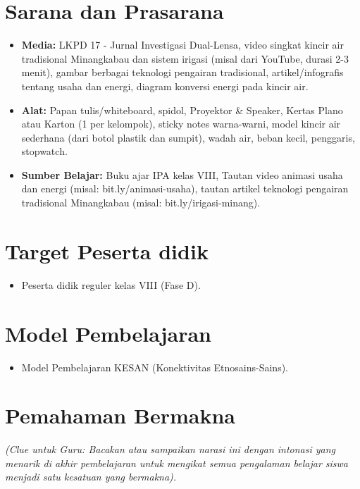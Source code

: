 \documentclass[12pt,a4paper]{article}
\begin{document}
\section{Sarana dan Prasarana}

\begin{itemize}
\item \textbf{Media:} LKPD 17 - Jurnal Investigasi Dual-Lensa, video singkat kincir air tradisional Minangkabau dan sistem irigasi (misal dari YouTube, durasi 2-3 menit), gambar berbagai teknologi pengairan tradisional, artikel/infografis tentang usaha dan energi, diagram konversi energi pada kincir air.
\item \textbf{Alat:} Papan tulis/whiteboard, spidol, Proyektor \& Speaker, Kertas Plano atau Karton (1 per kelompok), sticky notes warna-warni, model kincir air sederhana (dari botol plastik dan sumpit), wadah air, beban kecil, penggaris, stopwatch.
\item \textbf{Sumber Belajar:} Buku ajar IPA kelas VIII, Tautan video animasi usaha dan energi (misal: bit.ly/animasi-usaha), tautan artikel teknologi pengairan tradisional Minangkabau (misal: bit.ly/irigasi-minang).
\end{itemize}

\section{Target Peserta didik}

\begin{itemize}
\item Peserta didik reguler kelas VIII (Fase D).
\end{itemize}

\section{Model Pembelajaran}

\begin{itemize}
\item Model Pembelajaran KESAN (Konektivitas Etnosains-Sains).
\end{itemize}

\section{Pemahaman Bermakna}
\textit{(Clue untuk Guru: Bacakan atau sampaikan narasi ini dengan intonasi yang menarik di akhir pembelajaran untuk mengikat semua pengalaman belajar siswa menjadi satu kesatuan yang bermakna).}
\end{document}
